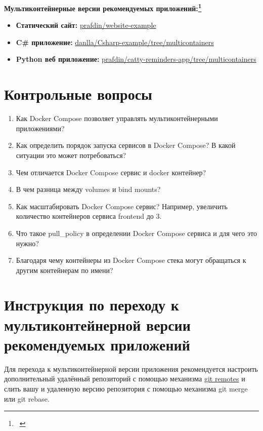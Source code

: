 \documentclass[12pt,a4paper]{article}
\begin{document}
    \textbf{Мультиконтейнерные версии рекомендуемых приложений:\footnote{~}}
    \begin{itemize}
        \item \textbf{Статический сайт:} \href{https://github.com/prafdin/website-example.git}{prafdin/website-example}
        \item \textbf{C\# приложение:} \href{https://github.com/danlla/Csharp-example/tree/multicontainers}{danlla/Csharp-example/tree/multicontainers}
        \item \textbf{Python веб приложение:} \href{https://github.com/prafdin/catty-reminders-app/tree/multicontainers}{prafdin/catty-reminders-app/tree/multicontainers}
    \end{itemize}

    \section{Контрольные вопросы}
    \begin{enumerate}
        \item Как Docker Compose позволяет управлять мультиконтейнерными приложениями?
        \item Как определить порядок запуска сервисов в Docker Compose? В какой ситуации это может потребоваться?
        \item Чем отличается Docker Compose сервис и docker контейнер?
        \item В чем разница между volumes и bind mounts?
        \item Как масштабировать Docker Compose сервис? Например, увеличить количество контейнеров сервиса frontend до 3.
        \item Что такое pull\_policy в определении Docker Compose сервиса и для чего это нужно?
        \item Благодаря чему контейнеры из Docker Compose стека могут обращаться к другим контейнерам по имени?
    \end{enumerate}

    \section{Инструкция по переходу к мультиконтейнерной версии рекомендуемых приложений}
    \label{sec:to-multiocontainers}
    Для перехода к мультиконтейнерной версии приложения рекомендуется настроить дополнительный удалённый репозиторий с помощью механизма
    \href{https://git-scm.com/book/ms/v2/Git-Basics-Working-with-Remotes}{git remotes} и слить вашу и удаленную версию репозитория с помощью механизма git merge или git rebase.
\end{document}
